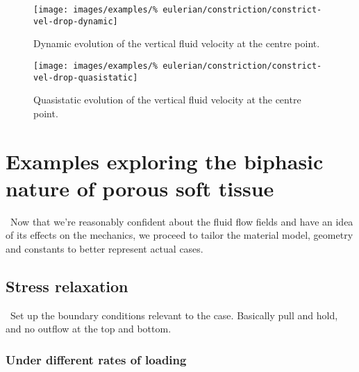 \begin{figure}[!hptb]
\centering
\texttt{[image: images/examples/\%
eulerian/constriction/constrict-vel-drop-dynamic]}
\caption{Dynamic evolution of the vertical fluid velocity at the
  centre point.}
\label{velocity-evolution-dynamic}
\end{figure}

\begin{figure}[!hptb]
\centering
\texttt{[image: images/examples/\%
eulerian/constriction/constrict-vel-drop-quasistatic]}
\caption{Quasistatic evolution of the vertical fluid velocity at the
  centre point.}
\label{velocity-evolution-quasistatic}
\end{figure}

\clearpage

\section{Examples exploring the biphasic nature of porous soft tissue}
\label{biphasic-examples-2}

\textbullet\ Now that we're reasonably confident about the fluid flow
fields and have an idea of its effects on the mechanics, we proceed to
tailor the material model, geometry and constants to better represent
actual cases.


\subsection{Stress relaxation}
\label{stress-relaxation}

\textbullet\ Set up the boundary conditions relevant to the
case. Basically pull and hold, and no outflow at the top and
bottom.

\subsubsection{Under different rates of loading}
\label{modifying-load-rates}

